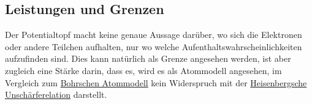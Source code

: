 \documentclass{article}
\begin{document}
\subsection{Leistungen und Grenzen}
Der Potentialtopf macht keine genaue Aussage darüber, wo sich die Elektronen oder andere Teilchen aufhalten, nur wo welche Aufenthaltswahrscheinlichkeiten aufzufinden sind. Dies kann natürlich als Grenze angesehen werden, ist aber zugleich eine Stärke darin, dass es, wird es als Atommodell angesehen, im Vergleich zum \hyperref[Das Bohrsche Atommodell]{Bohrschen Atommodell} kein Widerspruch mit der \hyperref[Heisenbergsche Unschärferelation]{Heisenbergsche Unschärferelation} darstellt.
\end{document}

